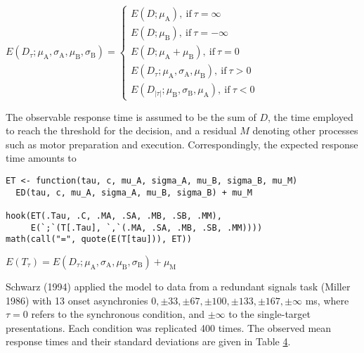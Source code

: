\({E{\left({{D}_{\tau}}{;}{{{\mu}_{\mathrm{A}}}{{,}{{\sigma}_{\mathrm{A}}}{{,}{{\mu}_{\mathrm{B}}}{{,}{{\sigma}_{\mathrm{B}}}}}}}\right)}}{=}{\left\{\begin{array}{l}{{E{\left({D}{;}{{\mu}_{\mathrm{A}}}\right)}},\ \mathrm{if}\ {{\tau}{=}{\infty}}}\\ {{E{\left({D}{;}{{\mu}_{\mathrm{B}}}\right)}},\ \mathrm{if}\ {{\tau}{=}{{-}{\infty}}}}\\ {{E{\left({D}{;}{{{\mu}_{\mathrm{A}}}{+}{{\mu}_{\mathrm{B}}}}\right)}},\ \mathrm{if}\ {{\tau}{=}{0}}}\\ {{E{\left({{D}_{\tau}}{;}{{{\mu}_{\mathrm{A}}}{{,}{{\sigma}_{\mathrm{A}}}{{,}{{\mu}_{\mathrm{B}}}}}}\right)}},\ \mathrm{if}\ {{\tau}{>}{0}}}\\ {{E{\left({{D}_{{\left\vert{\tau}\right\vert}}}{;}{{{\mu}_{\mathrm{B}}}{{,}{{\sigma}_{\mathrm{B}}}{{,}{{\mu}_{\mathrm{A}}}}}}\right)}},\ \mathrm{if}\ {{\tau}{<}{0}}}\end{array}\right.}\)

The observable response time is assumed to be the sum of \(D\), the time
employed to reach the threshold for the decision, and a residual \(M\)
denoting other processes such as motor preparation and execution.
Correspondingly, the expected response time amounts to

\begin{verbatim}
ET <- function(tau, c, mu_A, sigma_A, mu_B, sigma_B, mu_M)
  ED(tau, c, mu_A, sigma_A, mu_B, sigma_B) + mu_M

hook(ET(.Tau, .C, .MA, .SA, .MB, .SB, .MM),
     E(`;`(T[.Tau], `,`(.MA, .SA, .MB, .SB, .MM))))
math(call("=", quote(E(T[tau])), ET))
\end{verbatim}

\({E{\left({T}_{\tau}\right)}}{=}{{E{\left({{D}_{\tau}}{;}{{{\mu}_{\mathrm{A}}}{{,}{{\sigma}_{\mathrm{A}}}{{,}{{\mu}_{\mathrm{B}}}{{,}{{\sigma}_{\mathrm{B}}}}}}}\right)}}{+}{{\mu}_{\mathrm{M}}}}\)

Schwarz (1994) applied the model to data from a redundant signals task
(Miller 1986) with 13 onset asynchronies
\(0, \pm33, \pm67, \pm100, \pm133, \pm167, \pm\infty\) ms, where
\(\tau = 0\) refers to the synchronous condition, and \(\pm\infty\) to the
single-target presentations. Each condition was replicated 400 times.
The observed mean response times and their standard deviations are given
in Table \protect\hyperlink{tab:miller-data}{4}.

